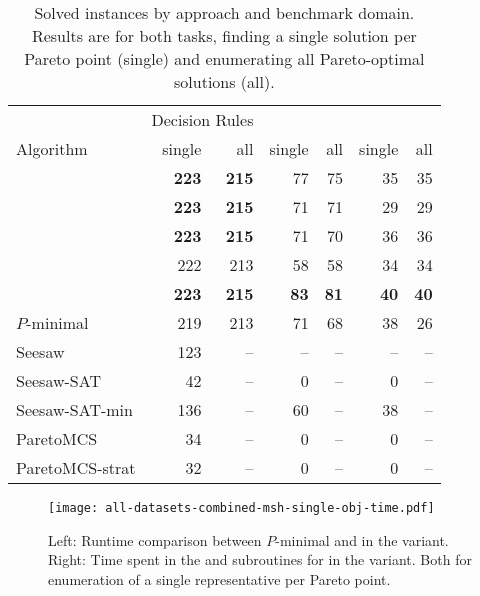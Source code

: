 \begin{table}
  \centering
  \caption{Solved instances by approach and benchmark domain.
    Results are for both tasks, finding a single solution per Pareto point (single) and enumerating all Pareto-optimal solutions (all).
  }\label{tab:nsolved}
  \begin{tabular}{@{}l@{\hspace{2em}}rrrrrr@{}}
    \toprule
    & \multicolumn{2}{c}{Decision Rules} & \multicolumn{2}{c}{\scep{}} & \multicolumn{2}{c}{\scsc{}} \\
    Algorithm & single & all & single & all & single & all \\
    \midrule
    \satunsat{} & \textbf{223} & \textbf{215} & 77 & 75 & 35 & 35 \\
    \unsatsat{} & \textbf{223} & \textbf{215} & 71 & 71 & 29 & 29 \\
    \msu{} & \textbf{223} & \textbf{215} & 71 & 70 & 36 & 36 \\
    \oll{} & 222 & 213 & 58 & 58 & 34 & 34 \\
    \msh{} & \textbf{223} & \textbf{215} & \textbf{83} & \textbf{81} & \textbf{40} & \textbf{40} \\\addlinespace
    $P$-minimal & 219 & 213 & 71 & 68 & 38 & 26 \\\addlinespace
    Seesaw & 123 & -- & -- & -- & -- & -- \\
    Seesaw-SAT & 42 & -- & 0 & -- & 0 & -- \\
    Seesaw-SAT-min & 136 & -- & 60 & -- & 38 & -- \\\addlinespace
    ParetoMCS & 34 & -- & 0 & -- & 0 & -- \\
    ParetoMCS-strat & 32 & -- & 0 & -- & 0 & -- \\
    \bottomrule
  \end{tabular}
\end{table}

\begin{figure}
  \centering
  \texttt{[image: all-datasets-combined-msh-single-obj-time.pdf]}
  \caption{Left: Runtime comparison between $P$-minimal and \algname{} in the \msh{} variant.
    Right: Time spent in the \Min{} and \Simpr{} subroutines for \algname{} in the \msh{} variant.
    Both for enumeration of a single representative per Pareto point.
  }\label{fig:combined-msh-single-obj-time}
\end{figure}

